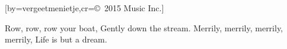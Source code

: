  

[by=vergeetmenietje,cr={\copyright~2015 Music Inc.}]




\beginverse
{}

Row, row, row your boat,
Gently down the stream.
Merrily, merrily, merrily, merrily,
Life is but a dream.
\endverse




\endsong

